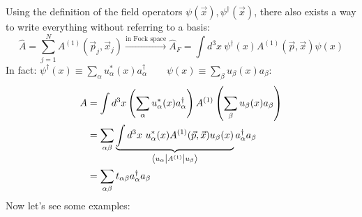 Using the definition of the field operators $\psi(\vec x), \psi^\dag(\vec x)$, there also exists a way to write everything without referring to a basis:
$$ \widehat A = \sum_{j=1}^N A^{(1)}\left(\vec p_j, \vec x_j\right) \xrightarrow[]{\text{in Fock space}} \widehat A_F = \int d^3x\  \psi^\dag(x)A^{(1)}\left(\vec p, \vec x\right) \psi(x)$$
In fact: $\psi^\dag(x) \equiv \sum_\alpha u_\alpha^* (x) a_\alpha^\dag \qquad \psi(x) \equiv \sum_\beta u_\beta (x) a_\beta $:
\begin{align*}
    A &= \int d^3 x \left(\sum_\alpha u_\alpha^*(x) a_\alpha^\dag\right) A^{(1)} \left(\sum_\beta u_\beta (x) a_\beta\right) \\
    &= \sum_{\alpha\beta}\underbrace{\int d^3x\ u_\alpha^*(x)A^{(1)}(\vec p, \vec x) u_\beta(x)}_{\brakett{u_\alpha}{A^{(1)}}{u_\beta}} a_\alpha^\dag a_\beta \\
    &= \sum_{\alpha\beta} t_{\alpha\beta} a_\alpha^\dag a_\beta
\end{align*}
Now let's see some examples:
